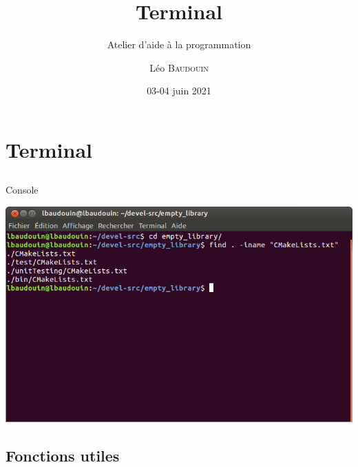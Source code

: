 \documentclass{beamer}
\title{Terminal}
\subtitle{Atelier d'aide à la programmation}
\author{L\'eo \textsc{Baudouin}}
\institute{
  {\url{baudouin.leo @ gmail.com}}
}
\date{03-04 juin 2021}
\begin{document}
\begin{frame}
  \titlepage
\end{frame}


\section{Terminal}

\subsection{}

\begin{frame}{Console}

\includegraphics[width=\linewidth]{images/terminal-exemple}

\end{frame}

\subsection{Fonctions utiles}
\end{document}

